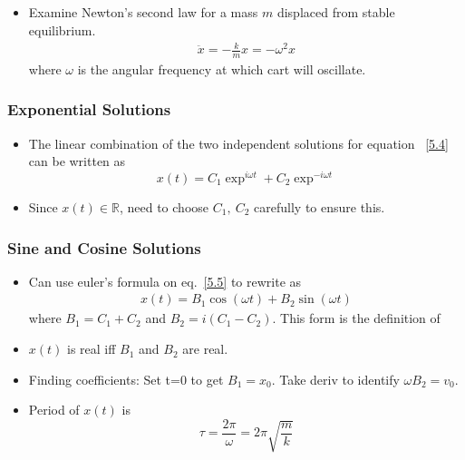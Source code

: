 \documentclass[10pt, twocolumn]{article}
\begin{document}
\subsection{}
\begin{itemize}
	\item Examine Newton's second law for a mass $m$ displaced from stable equilibrium.
	\begin{align}
		\ddot{x} = - \frac{k}{m} x = - \omega^2 x 
		\label{5.4}
	\end{align}
	where $\omega$ is the angular frequency at which cart will oscillate. \\
\end{itemize}

\subsubsection{Exponential Solutions}
\begin{itemize}
	\item The linear combination of the two independent solutions for equation ~\ref{5.4} can be written as
	\begin{equation}
		x(t) = C_1 \exp^{i \omega t} + C_2 \exp^{-i \omega t}
		\label{5.5}
	\end{equation}
	\item Since $x(t) \in \mathbb{R}$, need to choose $C_1,~C_2$ carefully to ensure this. \\
\end{itemize} 

\subsubsection{Sine and Cosine Solutions}
\begin{itemize}
	\item Can use euler's formula on eq.~\ref{5.5} to rewrite as
	\begin{align}
		x(t) = B_1 \cos(\omega t) +  B_2 \sin(\omega t)
		\label{5.6}
	\end{align}
	where $B_1 = C_1 + C_2$ and $B_2 = i (C_1 - C_2)$. This form is the definition of \textbf{} 
	\item $x(t)$ is real iff $B_1$ and $B_2$ are real. 
	\item Finding coefficients: Set t=0 to get $B_1 = x_0$. Take deriv to identify $\omega B_2 = v_0$. 
	\item Period of $x(t)$ is 
	\begin{equation}
		\tau = \frac{2 \pi}{\omega} = 2 \pi \sqrt{\frac{m}{k}}
		\label{5.9}
	\end{equation}
\end{itemize}
\newpage
\end{document}
